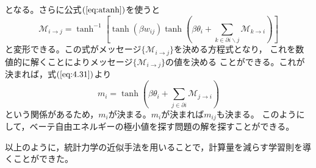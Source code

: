 となる。さらに公式$(\ref{eq:atanh})$を使うと
\begin{equation}
\mathcal{M}_{i\rightarrow j}=\tanh^{-1}\left[
\tanh(\beta w_{ij})\tanh\left(\beta\theta_{i}+
\sum_{k\in\partial i\backslash j}\mathcal{M}_{k\rightarrow i}\right)
\right]\label{eq:4.40}
\end{equation}
と変形できる。この式がメッセージ$\{\mathcal{M}_{i\rightarrow j}\}$を決める方程式となり，
これを数値的に解くことによりメッセージ$\{\mathcal{M}_{i\rightarrow j}\}$の値を決める
ことができる。これが決まれば，式$(\ref{eq:4.31})$より
\begin{equation}
m_{i}=\tanh\left(\beta\theta_{i}+\sum_{j\in\partial
i}\mathcal{M}_{j\rightarrow i}\right)\label{eq:4.41}
\end{equation}
という関係があるため，$m_{i}$が決まる。$m_{i}$が決まれば$m_{ij}$も決まる。
このようにして，ベーテ自由エネルギーの極小値を探す問題の解を探すことができる。

以上のように，統計力学の近似手法を用いることで，計算量を減らす学習則を導くことができた。